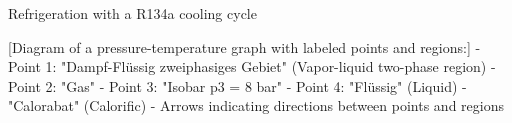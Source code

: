 Refrigeration with a R134a cooling cycle

[Diagram of a pressure-temperature graph with labeled points and regions:]
- Point 1: "Dampf-Flüssig zweiphasiges Gebiet" (Vapor-liquid two-phase region)
- Point 2: "Gas"
- Point 3: "Isobar p3 = 8 bar"
- Point 4: "Flüssig" (Liquid)
- "Calorabat" (Calorific)
- Arrows indicating directions between points and regions